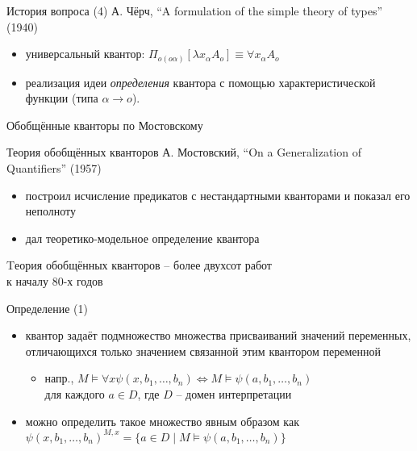 \documentclass{beamer}
\begin{document}
\begin{frame}{История вопроса (4)}
А. Чёрч, ``A formulation of the simple theory of types'' (1940)
\bigskip
\begin{itemize}
    \item универсальный квантор: $\Pi_{o(o\alpha)}[\lambda x_\alpha A_o] \equiv \forall x_\alpha A_o$
    \medskip
    \item реализация идеи \textit{определения} квантора с помощью характеристической функции (типа $\alpha \to o$).
\end{itemize}
\end{frame}


\begin{frame}{}
\begin{center}
Обобщённые кванторы по Мостовскому
\end{center}
\end{frame}

\begin{frame}{Теория обобщённых кванторов}
А. Мостовский, ``On a Generalization of Quantifiers'' (1957)
\bigskip
\begin{itemize}
	\item построил исчисление предикатов с нестандартными кванторами и показал его неполноту
	\item дал теоретико-модельное определение квантора
\end{itemize}
\bigskip
\bigskip
Tеория обобщённых кванторов -- более двухсот работ \\к началу 80-х годов
\end{frame}

\begin{frame}{Определение (1)}
\begin{itemize}
    \item квантор задаёт подмножество множества присваиваний значений переменных, отличающихся только значением связанной этим квантором переменной
    \medskip
    \begin{itemize}
        \item напр., $M \models \forall x \psi(x, b_1, \dots, b_n) \Leftrightarrow M \models \psi(a, b_1, \dots, b_n)$ \\для каждого $a \in D$, где $D$ -- домен интерпретации
    \end{itemize}
    \medskip
	\item можно определить такое множество явным образом как $\psi(x, b_1, \dots, b_n)^{M,x} = \{ a \in D \; | \; M \models \psi(a, b_1, \dots, b_n) \}$
\end{itemize}
\end{frame}
\end{document}
